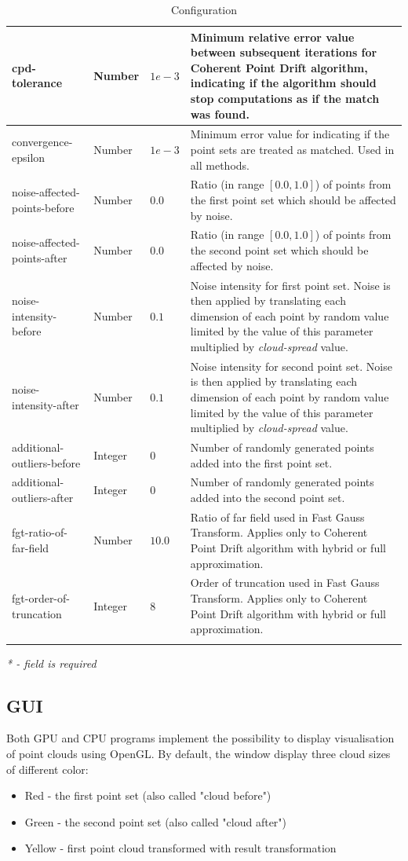 \documentclass[titlepage]{article}
\begin{document}
\begin{center}
\begin{longtable}{ | m{13em} | m{5em} | m{3em}| m{19em}| }
 \hline
 cpd-tolerance & Number & $1e-3$ & Minimum relative error value between subsequent iterations for Coherent Point Drift algorithm, indicating if the algorithm should stop computations as if the match was found. \\ 
 \hline
 convergence-epsilon & Number & $1e-3$ & Minimum error value for indicating if the point sets are treated as matched. Used in all methods. \\ 
 \hline
 noise-affected-points-before & Number & $0.0$ & Ratio (in range $[0.0, 1.0]$) of points from the first point set which should be affected by noise. \\ 
 \hline
 noise-affected-points-after & Number & $0.0$ & Ratio (in range $[0.0, 1.0]$) of points from the second point set which should be affected by noise. \\ 
 \hline
 noise-intensity-before & Number & $0.1$ & Noise intensity for first point set. Noise is then applied by translating each dimension of each point by random value limited by the value of this parameter multiplied by \textit{cloud-spread} value. \\ 
 \hline
 noise-intensity-after & Number & $0.1$ & Noise intensity for second point set. Noise is then applied by translating each dimension of each point by random value limited by the value of this parameter multiplied by \textit{cloud-spread} value. \\ 
 \hline
 additional-outliers-before & Integer & $0$ & Number of randomly generated points added into the first point set. \\ 
 \hline
 additional-outliers-after & Integer & $0$ & Number of randomly generated points added into the second point set. \\ 
 \hline
 fgt-ratio-of-far-field & Number & $10.0$ & Ratio of far field used in Fast Gauss Transform. Applies only to Coherent Point Drift algorithm with hybrid or full approximation. \\ 
 \hline
 fgt-order-of-truncation & Integer & $8$ & Order of truncation used in Fast Gauss Transform. Applies only to Coherent Point Drift algorithm with hybrid or full approximation. \\ 
 \hline
 \caption{Configuration}
\end{longtable}
\label{tab:configuration}
\end{center}
\textit{* - field is required}

\subsection{GUI}
Both GPU and CPU programs implement the possibility to display visualisation of point clouds using OpenGL. By default, the window display three cloud sizes of different color:
\begin{itemize}
\item Red - the first point set (also called "cloud before")
\item Green - the second point set (also called "cloud after")
\item Yellow - first point cloud transformed with result transformation
\end{itemize}
\end{document}
